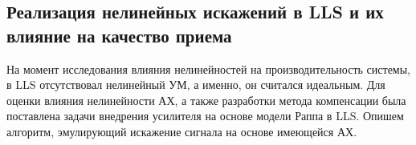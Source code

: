 





\subsection{Реализация нелинейных искажений в LLS и их влияние на качество приема}

На момент исследования влияния нелинейностей на производительность системы,
в LLS отсутствовал нелинейный УМ, а именно, он считался идеальным. Для
оценки влияния нелинейности АХ, а также разработки метода компенсации была
поставлена задачи внедрения усилителя на основе модели Раппа в LLS.
Опишем алгоритм, эмулирующий искажение сигнала на основе имеющейся АХ.

